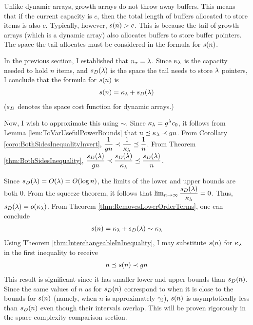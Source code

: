 \HdrSpaceComplex

Unlike dynamic arrays, growth arrays do not throw away buffers. This means that if the current capacity is $c$, then the total length of buffers allocated to store items is also $c$. Typically, however, $s(n) > c$. This is because the tail of growth arrays (which is a dynamic array) also allocates buffers to store buffer pointers. The space the tail allocates must be considered in the formula for $s(n)$.

In the previous section, I established that $n_\tau = \lambda$. Since $\kappa_\lambda$ is the capacity needed to hold $n$ items, and $s_D(\lambda)$ is the space the tail needs to store $\lambda$ pointers, I conclude that the formula for $s(n)$ is
\begin{align*}
s(n) = \kappa_\lambda + s_D(\lambda)
\end{align*}
($s_D$ denotes the space cost function for dynamic arrays.)

Now, I wish to approximate this using $\sim$. Since $\kappa_\lambda = g^\lambda c_0$, it follows from Lemma \ref{lem:ToVarUsefulPowerBounds} that $n \preceq \kappa_\lambda \prec g{n}$. From Corollary \ref{coro:BothSidesInequalityInvert}, $\dfrac{1}{g n} \prec \dfrac{1}{\kappa_\lambda} \preceq \dfrac{1}{n}$. From Theorem \ref{thm:BothSidesInequality}, $\dfrac{s_D(\lambda)}{g n} \prec \dfrac{s_D(\lambda)}{\kappa_\lambda} \preceq \dfrac{s_D(\lambda)}{n}$.

Since $s_D(\lambda) = O(\lambda) = O(\log n)$, the limits of the lower and upper bounds are both $0$. From the squeeze theorem, it follows that $\lim_{n \to \infty} \dfrac{s_D(\lambda)}{\kappa_\lambda} = 0$. Thus, $s_D(\lambda) = o(\kappa_\lambda)$. From Theorem \ref{thm:RemovesLowerOrderTerms}, one can conclude
\begin{align*}
s(n) = \kappa_\lambda + s_D(\lambda) \sim \kappa_\lambda
\end{align*}
Using Theorem \ref{thm:InterchangeableInInequality}, I may substitute $s(n)$ for $\kappa_\lambda$ in the first inequality to receive
\begin{align*}
n \preceq s(n) \prec g{n}
\end{align*}
This result is significant since it has smaller lower and upper bounds than $s_D(n)$. Since the same values of $n$ as for $s_D(n)$ correspond to when it is close to the bounds for $s(n)$ (namely, when $n$ is approximately $\gamma_i$), $s(n)$ is asymptotically less than $s_D(n)$ even though their intervals overlap. This will be proven rigorously in the space complexity comparison section.